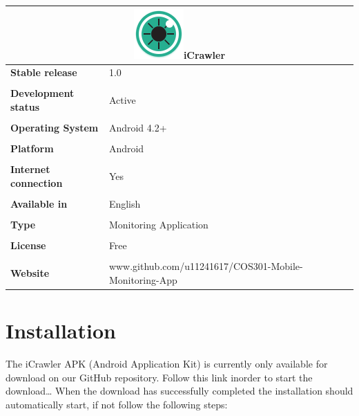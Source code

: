 \documentclass[hidelinks, 12pt, oneside]{article}
\begin{document}
	\begin{tabular}{ |l|l| }  \multicolumn{2}{|c|}{\includegraphics[width=0.1 \textwidth]{img/icon.png}iCrawler}
	 \\ \hline\noalign{\smallskip} \textbf{Stable release} & 1.0
	  \\\\ \noalign{\smallskip} \textbf{Development status}& Active
	  \\\\ \noalign{\smallskip}\textbf{Operating System}& Android 4.2+
	  \\\\ \noalign{\smallskip}\textbf{Platform}& Android
	  \\\\ \noalign{\smallskip}\textbf{Internet connection} & Yes
	  \\\\ \noalign{\smallskip}\textbf{Available in} & English
	  \\\\ \noalign{\smallskip}\textbf{Type}& Monitoring Application
	  \\\\ \noalign{\smallskip}\textbf{License}& Free
	  \\\\ \noalign{\smallskip}\textbf{Website}& www.github.com/u11241617/COS301-Mobile-Monitoring-App
	 \end{tabular}\newpage
	\section{Installation}
	The iCrawler APK (Android Application Kit) is currently only available for download on our GitHub repository. Follow this link inorder 
	to start the download\dots\newline\newline
	When the download has successfully completed the installation should automatically start, if not follow the following steps:\newline
	  
\end{document}
